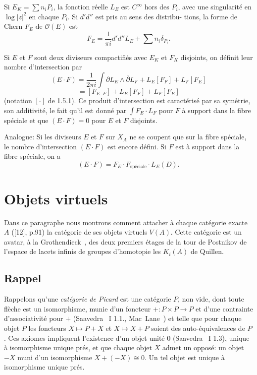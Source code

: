 \documentclass[12pt,a4paper]{article}
\theoremstyle{plain}
\theoremstyle{definition}
\newcommand{\Oo}{\mathscr{O}}
\begin{document}
\smallskip

Si $E_K = \sum n_i P_i$, la fonction r\'eelle $L_E$ est $C^\infty$ hors des $P_i$, avec une
singularit\'e en $\log |z|^2$ en chaque $P_i$. Si $d'd''$ est pris au sens des distribu-
tions, la forme de Chern $F_E$ de $\Oo(E)$ est
\[
F_E = \frac{1}{\pi i} d'd'' L_E + \sum n_i \delta_{P_i} .
\]

Si $E$ et $F$ sont deux diviseurs compactifi\'es avec $E_K$ et $F_K$ disjoints,
on d\'efinit leur nombre d'intersection par
\[
(E \cdot F) = \frac{1}{2\pi i} \int \partial L_E \wedge \bar\partial L_F + L_E [F_F] + L_F [F_E]
\]
\[
= [F_{E \cdot F}] + L_E [F_F] + L_F [F_E]
\]
(notation $[\cdot]$ de 1.5.1). Ce produit d'intersection est caract\'eris\'e par sa sym\'etrie,
son additivit\'e, le fait qu'il est donn\'e par $\int F_E \cdot L_F$ pour $F$ \`a support dans la fibre
sp\'eciale et que $(E \cdot F) = 0$ pour $E$ et $F$ disjoints.

Analogue: Si les diviseurs $E$ et $F$ sur $X_A$ ne se coupent que sur la fibre
sp\'eciale, le nombre d'intersection $(E \cdot F)$ est encore d\'efini. Si $F$ est \`a support
dans la fibre sp\'eciale, on a
\[
(E \cdot F) = F_E \cdot F_{\text{sp\'eciale}} \cdot L_E(D) .
\]



\section{Objets virtuels}

Dans ce paragraphe nous montrons comment attacher \`a chaque cat\'egorie exacte
$A$ ([12], p.91) la cat\'egorie de ses objets virtuels $V(A)$. Cette cat\'egorie est un
avatar, \`a la Grothendieck~\cite{9}, des deux premiers \'etages de la tour de Postnikov
de l'espace de lacets infinis de groupes d'homotopie les $K_i(A)$ de Quillen.

\subsection{Rappel}

Rappelons qu'une \emph{cat\'egorie de Picard} est une cat\'egorie $P$, non vide, dont
toute fl\`eche est un isomorphisme, munie d'un foncteur $+: P \times P \to P$ et d'une
contrainte d'associativit\'e pour $+$ (Saavedra~\cite{15} I 1.1., Mac~Lane~\cite{11}) et
telle que pour chaque objet $P$ les foncteurs $X \mapsto P + X$ et $X \mapsto X + P$ soient
des auto-\'equivalences de $P$. Ces axiomes impliquent l'existence d'un objet unit\'e
$0$ (Saavedra~\cite{15} I 1.3), unique \`a isomorphisme unique pr\'es, et que chaque objet
$X$ admet un oppos\'e: un objet $-X$ muni d'un isomorphisme $X + (-X) \cong 0$. Un
tel objet est unique \`a isomorphisme unique pr\'es.
\end{document}

